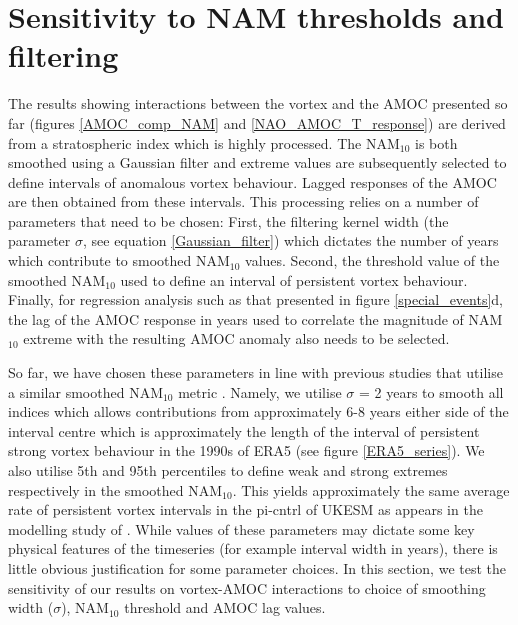 \section{Sensitivity to NAM thresholds and filtering}
\label{sec:sensitivity}

The results showing interactions between the vortex and the AMOC presented so far (figures \ref{AMOC_comp_NAM} and \ref{NAO_AMOC_T_response}) are derived from a stratospheric index which is highly processed. The NAM$_{10}$ is both smoothed using a Gaussian filter and extreme values are subsequently selected to define intervals of anomalous vortex behaviour. Lagged responses of the AMOC are then obtained from these intervals. This processing relies on a number of parameters that need to be chosen: First, the filtering kernel width (the parameter $\sigma$, see equation \ref{Gaussian_filter}) which dictates the number of years which contribute to smoothed NAM$_{10}$ values. Second, the threshold value of the smoothed NAM$_{10}$ used to define an interval of persistent vortex behaviour. Finally, for regression analysis such as that presented in figure \ref{special_events}d, the lag of the AMOC response in years used to correlate the magnitude of NAM$_{10}$ extreme with the resulting AMOC anomaly also needs to be selected. 

So far, we have chosen these parameters in line with previous studies that utilise a similar smoothed NAM$_{10}$ metric \citep{reichlerStratospheric2012b}. Namely, we utilise $\sigma$ = 2 years to smooth all indices which allows contributions from approximately 6-8 years either side of the interval centre which is approximately the length of the interval of persistent strong vortex behaviour in the 1990s of ERA5 (see figure \ref{ERA5_series}). We also utilise 5th and 95th percentiles to define weak and strong extremes respectively in the smoothed NAM$_{10}$. This yields approximately the same average rate of persistent vortex intervals in the pi-cntrl of UKESM as appears in the modelling study of \cite{reichlerStratospheric2012b}. While values of these parameters may dictate some key physical features of the timeseries (for example interval width in years), there is little obvious justification for some parameter choices. In this section, we test the sensitivity of our results on vortex-AMOC interactions to choice of smoothing width ($\sigma$), NAM$_{10}$ threshold and AMOC lag values. 

